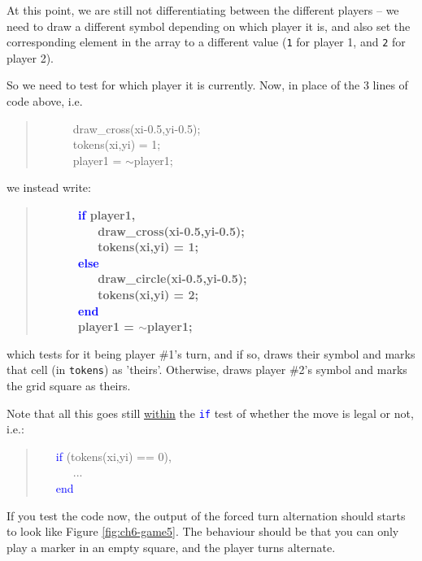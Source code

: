 \documentclass{tufte-book} %
\newenvironment{docspec}{\begin{quotation}\ttfamily\parskip0pt\parindent0pt\ignorespaces}{\end{quotation}}
\newenvironment{docspecbold}{\begin{quotation}\ttfamily\bfseries\parskip0pt\parindent0pt\ignorespaces}{\end{quotation}}
\begin{document}
At this point, we are still not differentiating between the different players -- we need to draw a different symbol depending on which player it is, and also set the corresponding element in the array to a different value (\texttt{1} for player 1, and \texttt{2} for player 2).

So we need to test for which player it is currently. Now, in place of the 3 lines of code above, i.e.
\begin{docspec}
\ \ \ \ \ \         draw\_cross(xi-0.5,yi-0.5);\\
\ \ \ \ \ \        tokens(xi,yi) = 1;\\
\ \ \ \ \ \         player1 = \(\sim\)player1;
\end{docspec}
we instead write:
\begin{docspecbold}
\ \ \ \ \ \          \textcolor{blue}{if} player1,\\
\ \ \ \ \ \ \ \ \             draw\_cross(xi-0.5,yi-0.5);\\
\ \ \ \ \ \ \ \ \             tokens(xi,yi) = 1;\\
\ \ \ \ \ \         \textcolor{blue}{else}\\
\ \ \ \ \ \ \ \ \             draw\_circle(xi-0.5,yi-0.5);\\
\ \ \ \ \ \ \ \ \             tokens(xi,yi) = 2;\\
\ \ \ \ \ \         \textcolor{blue}{end}\\
\ \ \ \ \ \         player1 = \(\sim\)player1;
\end{docspecbold}
which tests for it being player \#1's turn, and if so, draws their symbol and marks that cell (in \texttt{tokens}) as 'theirs'. Otherwise, draws player \#2's symbol and marks the grid square as theirs.

Note that all this goes still \uline{within} the \texttt{\textcolor{blue}{if}} test of whether the move is legal or not, i.e.:
\begin{docspec}
\ \ \     \textcolor{blue}{if} (tokens(xi,yi) == 0),\\
\ \ \ \ \ \         ...\\
\ \ \     \textcolor{blue}{end}
\end{docspec}

If you test the code now, the output of the forced turn alternation should starts to look like Figure \ref{fig:ch6-game5}. The behaviour should be that you can only play a marker in an empty square, and the player turns alternate.
\end{document}
